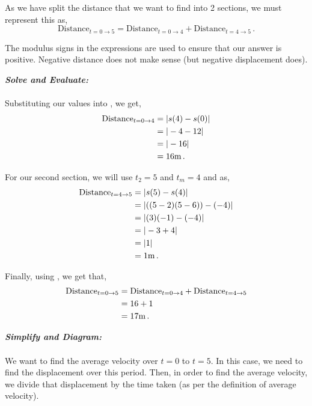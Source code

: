 \begin{subquestions}
\begin{subsubquestions}
\begin{subsubsubquestions}
			As we have split the distance that we want to find into 2 sections, we must represent this as,
			\begin{equation}
				\text{Distance}_{t=0 \rightarrow 5} = \text{Distance}_{t=0 \rightarrow 4} + \text{Distance}_{t=4 \rightarrow 5} \,. \label{2014:q5*:Seqn3}
			\end{equation}
			
			The modulus signs in the expressions are used to ensure that our answer is positive. Negative distance does not make sense (but negative displacement does).
			
			
			
			\textbf{\textit{Solve and Evaluate:}} \\ \\
			Substituting our values into , we get,
			\begin{align}
				\text{Distance}_{t=0 \rightarrow 4} & = |s(4)-s(0)| \nonumber \\
				& = |-4-12| \nonumber \\
				& = |-16| \nonumber \\
				& = 16 \text{m} \,.
			\end{align}
			
			For our second section, we will use $t_2=5$ and $t_m=4$ and  as,
			\begin{align}
				\text{Distance}_{t=4 \rightarrow 5} & = |s(5)-s(4)| \nonumber \\
				& = |((5-2)(5-6)) -(-4)| \nonumber \\
				& = |(3)(-1)-(-4)| \nonumber \\
				& = |-3+4| \nonumber \\
				& = |1| \nonumber \\
				& = 1 \text{m} \,.
			\end{align}
			
			Finally, using , we get that,
			\begin{align}
				\text{Distance}_{t=0 \rightarrow 5} & = \text{Distance}_{t=0 \rightarrow 4} + \text{Distance}_{t=4 \rightarrow 5} \nonumber \\
				& = 16 + 1 \nonumber \\
				& = 17 \text{m} \,.
			\end{align}
			
			
			\subsubsubquestion
			
			\textbf{\textit{Simplify and Diagram:}} \\ \\
			We want to find the average velocity over $t=0$ to $t=5$. In this case, we need to find the displacement over this period. Then, in order to find the average velocity, we divide that displacement by the time taken (as per the definition of average velocity). \\
			

\end{subsubsubquestions}
\end{subsubquestions}
\end{subquestions}

